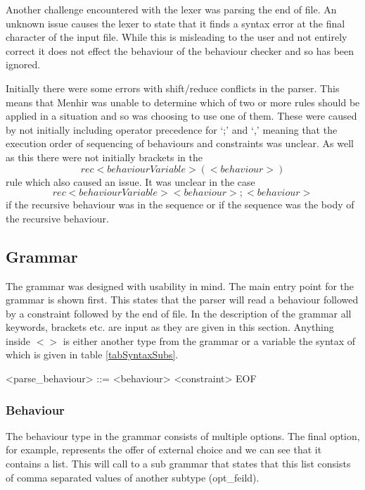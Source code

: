 Another challenge encountered with the lexer was parsing the end of file. An unknown issue causes the lexer to state that it finds a syntax error at the final character of the input file. While this is misleading to the user and not entirely correct it does not effect the behaviour of the behaviour checker and so has been ignored. 

Initially there were some errors with shift/reduce conflicts in the parser. This means that Menhir was unable to determine which of two or more rules should be applied in a situation and so was choosing to use one of them. These were caused by not initially including operator precedence for `;' and `,' meaning that the execution order of sequencing of behaviours and constraints was unclear. As well as this there were not initially brackets in the $$rec <behaviourVariable> (<behaviour>)$$ rule which also caused an issue. It was unclear in the case $$rec <behaviourVariable> <behaviour> ; <behaviour>  $$ if the recursive behaviour was in the sequence or if the sequence was the body of the recursive behaviour. 

\subsection{Grammar} \label{gram}

The grammar was designed with usability in mind. The main entry point for the grammar is shown first. This states that the parser will read a behaviour followed by a constraint followed by the end of file. In the description of the grammar all keywords, brackets etc. are input as they are given in this section. Anything inside $< >$ is either another type from the grammar or a variable the syntax of which is given in table \ref{tabSyntaxSubs}.

\begin{grammar}

<parse_behaviour> ::= <behaviour> <constraint> EOF

\end{grammar}

\subsubsection{Behaviour}

The behaviour type in the grammar consists of multiple options. The final option, for example, represents the offer of external choice and we can see that it contains a list. This will call to a sub grammar that states that this list consists of comma separated values of another subtype (opt_feild). 

